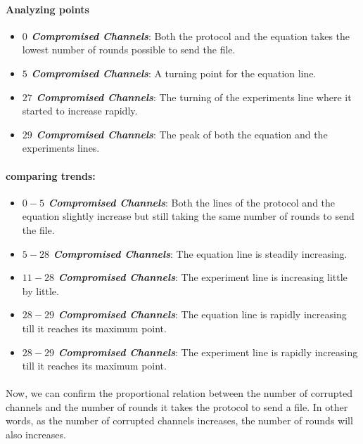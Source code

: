 \documentclass[main.tex]{subfiles}
\begin{document}
\paragraph{Analyzing points}
\begin{itemize}
\item \textbf{\textit{$0$ Compromised Channels}}: Both the protocol and the equation takes the lowest number of rounds possible to send the file.
\item \textbf{\textit{$5$ Compromised Channels}}: A turning point for the equation line.
\item \textbf{\textit{$27$ Compromised Channels}}: The turning of the experiments line where it started to increase rapidly.  
\item \textbf{\textit{$29$ Compromised Channels}}: The peak of both the equation and the experiments lines.  
\end{itemize}
\paragraph{comparing trends:}
\begin{itemize}
\item \textbf{\textit{$0-5$ Compromised Channels}}: Both the lines of the protocol and the equation slightly increase but still taking the same number of rounds to send the file.
\item \textbf{\textit{$5-28$ Compromised Channels}}: The equation line is steadily increasing.
\item \textbf{\textit{$11-28$ Compromised Channels}}: The experiment line is increasing little by little.
\item \textbf{\textit{$28-29$ Compromised Channels}}: The equation line is rapidly increasing till it reaches its maximum point.
\item \textbf{\textit{$28-29$ Compromised Channels}}: The experiment line is rapidly increasing till it reaches its maximum point.
\end{itemize}
\paragraph{}
Now, we can confirm the proportional relation between the number of corrupted channels and the number of rounds it takes the protocol to send a file. In other words, as the number of corrupted channels increases, the number of rounds will also increases.\\
\end{document}
